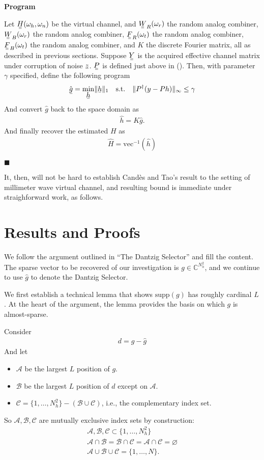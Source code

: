 \documentclass[12pt]{article}
\newcommand{\MB}[1]{\mathbb{#1}}
\newcommand{\MC}[1]{\mathcal{#1}}
\newcommand{\RM}[1]{\mathrm{#1}}
\newcommand{\V}[1]{\stackunder[1.2pt]{$#1$}{\rule{.9ex}{.075ex}}}
\newcommand{\M}[1]{\V{\V{#1}}}
\renewcommand{\H}{\dagger}
\newcounter{NumResult}
\newcommand{\myCount}
{
   \stepcounter{NumResult}
   \textbf{\arabic{NumResult}}
}
\newcommand {\Result} [2]
{
   \bigskip
   \myCount \textbf{#1} \par
   {#2} \par
   \hfill \(\blacksquare\)
   \bigskip
}
\begin{document}
\Result
{Program}
{
Let \(\M{H}(\omega_h, \omega_n)\) be the virtual channel, and \(\M{W}_R(\omega_r)\) the random analog combiner, \(\M{W}_B(\omega_r)\) the random analog combiner, \(\M{F}_R(\omega_t)\) the random analog combiner, \(\M{F}_B(\omega_t)\) the random analog combiner, and \(K\) the discrete Fourier matrix, all as described in previous sections.
Suppose \(\M{Y}\) is the acquired effective channel matrix under corruption of noise \(\V{z}\).
\(\M{P}\) is defined just above in ().
Then, with parameter \(\gamma\) specified, define the following program
\begin{gather}
\hat{\V{g}}
=\underset {\V{h}} {\RM{min}} \|\V{h}\|_1 \quad
\RM{s.t.}\quad \|P^\H (y -P h)\|_\infty \leq \gamma
\end{gather}
And convert \(\hat{g}\) back to the space domain as
\begin{gather}
\hat{h}
=K \hat{g}.
\end{gather}
And finally recover the estimated \(H\) as
\begin{gather}
\hat{H} =\RM{vec}^{-1} (\hat{h})
\end{gather}
}

It, then, will not be hard to establish Cand\`es and Tao's result to the setting of millimeter wave virtual channel, and resulting bound is immediate under straighforward work, as follows.

\section{Results and Proofs}

We follow the argument outlined in ``The Dantzig Selector'' and fill the content.
The sparse vector to be recovered of our investigation is \(g \in \MB{C}^{N_h^2}\), and we continue to use \(\hat{g}\) to denote the Dantzig Selector.

We first establish a technical lemma that shows \(\RM{supp}(g)\) has roughly cardinal \(L\).
At the heart of the argument, the lemma provides the basis on which \(g\) is almost-sparse.

Consider
\begin{gather}
d =g -\hat{g}
\end{gather}
And let
\begin{itemize}
\item \(\MC{A}\) be the largest \(L\) position of \(g\).
\item \(\MC{B}\) be the largest \(L\) position of \(d\) except on \(\MC{A}\).
\item \(\MC{C} =\{1, \dotsc, N_h^2\} -( \MC{B} \cup \MC{C} )\), i.e., the complementary index set.
\end{itemize}
So \(\MC{A}, \MC{B}, \MC{C}\) are mutually exclusive index sets by construction:
\begin{gather}
\MC{A}, \MC{B}, \MC{C} \subset \{1, \dotsc, N_h^2\} \\
\MC{A} \cap \MC{B} =\MC{B} \cap \MC{C} =\MC{A} \cap \MC{C} =\varnothing \\
\MC{A} \cup \MC{B} \cup \MC{C} =\{1, \dotsc, N\}.
\end{gather}
\end{document}
